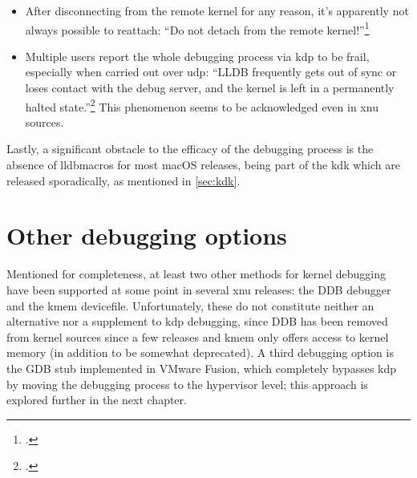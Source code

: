 \begin{itemize}
    \item After disconnecting from the remote kernel for any reason, it's apparently not always possible to reattach: \enquote{Do not detach from the remote kernel!}\footcite{DarwinDoc1}

    \item Multiple users report the whole debugging process via \gls{kdp} to be frail, especially when carried out over \gls{udp}: \enquote{LLDB frequently gets out of sync or loses contact with the debug server, and the kernel is left in a permanently halted state.}\footcite{MacOSDebug9} This phenomenon seems to be acknowledged even in \gls{xnu} sources.
\end{itemize}

Lastly, a significant obstacle to the efficacy of the debugging process is the absence of lldbmacros for most macOS releases, being part of the \gls{kdk} which are released sporadically, as mentioned in \cref{sec:kdk}.


\section{Other debugging options}
Mentioned for completeness, at least two other methods for kernel debugging have been supported at some point in several \gls{xnu} releases: the DDB debugger and the kmem \gls{devicefile}. Unfortunately, these do not constitute neither an alternative nor a supplement to \gls{kdp} debugging, since DDB has been removed from kernel sources since a few releases and kmem only offers access to kernel memory (in addition to be somewhat deprecated). A third debugging option is the GDB stub implemented in VMware Fusion, which completely bypasses \gls{kdp} by moving the debugging process to the hypervisor level; this approach is explored further in the next chapter.

